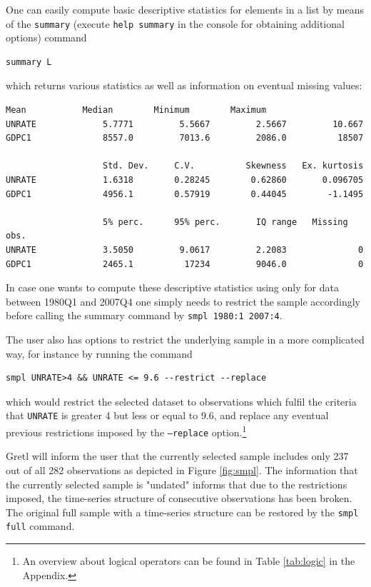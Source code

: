 \documentclass[11pt]{article}
\begin{document}
One can easily compute basic descriptive statistics for elements in a list by means of the \texttt{summary} (execute \texttt{help summary} in the console for obtaining additional options) command
\begin{verbatim}
summary L
\end{verbatim}
which returns various statistics as well as information on eventual missing values:
\begin{Verbatim}[baselinestretch=0.75]
                   Mean           Median        Minimum        Maximum
UNRATE             5.7771         5.5667         2.5667         10.667
GDPC1              8557.0         7013.6         2086.0          18507

                   Std. Dev.     C.V.          Skewness   Ex. kurtosis
UNRATE             1.6318        0.28245        0.62860       0.096705
GDPC1              4956.1        0.57919        0.44045        -1.1495

                   5% perc.      95% perc.       IQ range   Missing obs.
UNRATE             3.5050         9.0617         2.2083              0
GDPC1              2465.1          17234         9046.0              0
\end{Verbatim}

In case one wants to compute these descriptive statistics using only for data between 1980Q1 and 2007Q4 one simply needs to restrict the sample accordingly before calling the summary command by \texttt{smpl 1980:1 2007:4}.

The user also has options to restrict the underlying sample in a more complicated way, for instance by running the command 
\begin{verbatim}
smpl UNRATE>4 && UNRATE <= 9.6 --restrict --replace
\end{verbatim}
which would restrict the selected dataset to observations which fulfil the criteria that \texttt{UNRATE} is greater 4 but less or equal to 9.6, and replace any eventual previous restrictions imposed by the \texttt{---replace} option.\footnote{An overview about logical operators can be found in Table \ref{tab:logic} in the Appendix.}

Gretl will inform the user that the currently selected sample includes only 237 out of all 282 observations as depicted in Figure \ref{fig:smpl}. The information that the currently selected sample is "undated" informs that due to the restrictions imposed, the time-series structure of consecutive observations has been broken. The original full sample with a time-series structure can be restored by the \texttt{smpl full} command.
\end{document}

